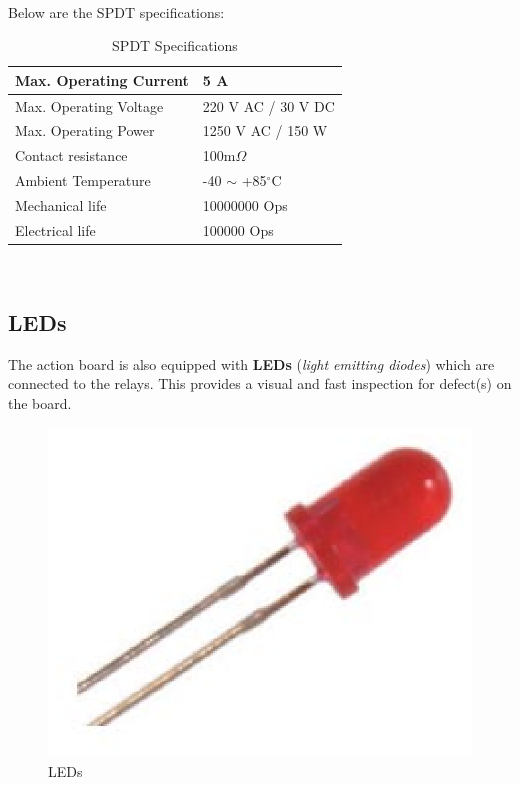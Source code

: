 \documentclass[12pt,a4paper]{report}
\begin{document}
\ \\
Below are the SPDT specifications:
\begin{table}[h]
\centering
    \begin{tabular}{|l|l|}
    \hline Max. Operating Current & 5 A \\
    \hline Max. Operating Voltage & 220 V AC / 30 V DC \\
    \hline Max. Operating Power & 1250 V AC / 150 W \\
    \hline Contact resistance & 100m$\Omega$ \\
    \hline Ambient Temperature & -40 $\sim$ +85$^\circ$C \\
    \hline Mechanical life & 10000000 Ops \\
    \hline Electrical life & 100000 Ops \\
    \hline
    \end{tabular}
    \caption{SPDT Specifications}
\end{table}
\ \\
\subsection{LEDs}
The action board is also equipped with \textbf{LEDs} (\textit{light emitting diodes}) which are connected to the relays. This provides a visual and fast inspection for defect(s) on the board.
\begin{figure}[H]
\centering
    \includegraphics*[scale=0.3]{led}
    \caption{LEDs}
\end{figure}
\ \\
%
\end{document}
